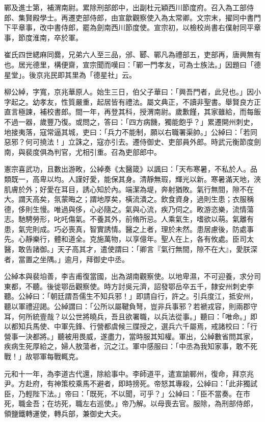 \begin{pinyinscope}
 鄲及進士第，補渭南尉。累除刑部郎中，出副杜元穎西川節度府。召入為工部侍郎、集賢殿學士。再遷吏部侍郎，由宣歙觀察使入為太常卿。文宗末，擢同中書門下平章事，改中書侍郎，罷為劍南西川節度使。宣宗初，以檢校尚書右僕射同平章事，節度淮南，卒於軍。



 崔氏四世緦麻同爨，兄弟六人至三品，邠、郾、鄲凡為禮部五，吏部再，唐興無有也。居光德里，構便齋，宣宗聞而嘆曰：「鄲一門孝友，可為士族法。」因題曰「德星堂」。後京兆民即其里為「德星社」云。



 柳公綽，字寬，京兆華原人。始生三日，伯父子華曰：「興吾門者，此兒也。」因小字起之。幼孝友，性質嚴重，起居皆有禮法。屬文典正，不讀非聖書。舉賢良方正直言極諫，補校書郎。間一年，再登其科，授渭南尉。歲歉饉，其家雖給，而每飯不過一器，歲豐乃復。或問之，答曰：「四方病饑，獨能飽乎？」累遷開州刺史，地接夷落，寇常逼其城，吏曰：「兵力不能制，願以右職署渠帥。」公綽曰：「若同惡邪？何可撓法！」立誅之，寇亦引去。遷侍御史、吏部員外郎。時武元衡節度劍南，與裴度俱為判官，尤相引重。召為吏部郎中。



 憲宗喜武功，且數出游畋，公綽奏《太醫箴》以諷曰：「天布寒暑，不私於人。品類既一，高卑以均。人謹好愛，能保其身。清靜無瑕，輝光以新。寒暑滿天地，浹肌膚於外；好愛在耳目，誘心知於內。端潔為堤，奔射猶敗。氣行無間，隙不在大。謂天高矣，氛蒙晦之；謂地厚矣，橫流潰之。飲食資身，過則生患；衣服稱德，侈則生慢。唯過與侈，心必隨之。氣與心流，疾乃伺之。畋游恣樂，流情蕩志。馳騁勞形，叱吒傷氣。不養其外，前脩所忌。人乘氣生，嗜欲以萌。氣離有患，氣完則成。巧必喪真，智實誘情。醫之上者，理於未然。患居慮後，防處事先。心靜樂行，體和道全。克施萬物，以享億年。聖人在上，各有攸處。臣司太醫，敢告諸御。」天子高其才，遣使謂曰：「卿言『氣行無間，隙不在大』，愛朕深者，當置之坐隅。」逾月，拜御史中丞。



 公綽本與裴垍善，李吉甫復當國，出為湖南觀察使。以地卑濕，不可迎養，求分司東都，不聽。後徙鄂岳觀察使。時方討吳元濟，詔發鄂岳卒五千，隸安州刺史李聽。公綽曰：「朝廷謂吾儒生不知兵邪！」即請自行，許之。引兵度江，抵安州，聽以軍禮迎謁。公綽謂曰：「公所以屬鞬負弩，豈非兵事邪？若褫戎容，則兩郡守耳，何所統壹哉？以公世將曉兵，吾且欲署職，以兵法從事。」聽曰：「唯命。」即以都知兵馬使、中軍先鋒、行營都虞候三牒授之，選兵六千屬焉，戒諸校曰：「行營事一決都將。」聽被用畏威，遂盡力，當時服其知權。軍出，公綽數省問其家，疾病生死厚給之，婦人敖蕩者，沉之江。軍中感服曰：「中丞為我知家事，敢不死戰！」故鄂軍每戰輒克。



 元和十一年，為李道古代還，除給事中。李師道平，遣宣諭鄆州，復命，拜京兆尹。方赴府，有神策校乘馬不避者，即時搒死。帝怒其專殺，公綽曰：「此非獨試臣，乃輕陛下法。」帝曰：「既死，不以聞，可乎？」公綽曰：「臣不當奏。在市死，職金吾；在坊死，職左右巡使。」帝乃解。以母喪去官。服除，為刑部侍郎，領鹽鐵轉運使，轉兵部，兼御史大夫。




\end{pinyinscope}
